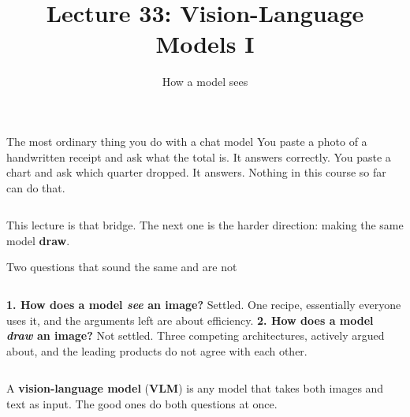 \documentclass[aspectratio=169]{beamer}
\title{Lecture 33: Vision-Language Models I}
\subtitle{How a model sees}
\date{}
\begin{document}
\begin{frame}
  \titlepage
\end{frame}

\begin{frame}{The most ordinary thing you do with a chat model}
  \small
  You paste a photo of a handwritten receipt and ask what the total is. It answers
  correctly. You paste a chart and ask which quarter dropped. It answers.
  \vskip 6pt
  Nothing in this course so far can do that.
  \vskip 8pt
  \begin{columns}[T]
  \end{columns}
  \vskip 8pt
  This lecture is that bridge. The next one is the harder direction: making the same model
  \textbf{draw}.
\end{frame}

\begin{frame}{Two questions that sound the same and are not}
  \small
  \begin{columns}[T]
    \textbf{1. How does a model \emph{see} an image?}
    \vskip 4pt
    \footnotesize
    Settled. One recipe, essentially everyone uses it, and the arguments left are about
    efficiency.
    \vskip 6pt
    \textbf{2. How does a model \emph{draw} an image?}
    \vskip 4pt
    \footnotesize
    Not settled. Three competing architectures, actively argued about, and the leading
    products do not agree with each other.
    \vskip 6pt
  \end{columns}
  \vskip 10pt
  \centering
  A \textbf{vision-language model} (\textbf{VLM}) is any model that takes both images and
  text as input. The good ones do both questions at once.
\end{frame}
\end{document}
